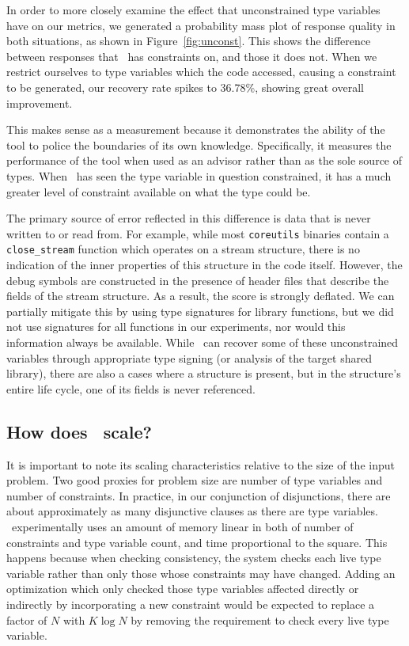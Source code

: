 In order to more closely examine the effect that unconstrained type variables have on our metrics, we generated a probability mass plot of response quality in both situations, as shown in Figure~\ref{fig:unconst}. This shows the
difference between responses that \bitr\ has constraints on, and those it does not.
When we restrict ourselves to type variables which the code accessed, causing a constraint to be generated, our recovery rate spikes to 36.78\%, showing great overall improvement.

This makes sense as a measurement because it demonstrates the ability of the tool to police the boundaries of its own knowledge. Specifically, it measures the performance of the tool when used as an advisor rather than as the sole source of types. When \bitr\ has seen the type variable in question constrained, it has a much greater level of constraint available on what the type could be.

The primary source of error reflected in this difference is data that is never written to or read from. For example, while most \texttt{coreutils} binaries contain a \texttt{close\_stream} function which operates on a stream structure, there is no indication of the inner properties of this structure in the code itself. However, the debug symbols are constructed in the presence of header files that describe the fields of the stream structure. As a result, the score is strongly deflated.
We can partially mitigate this by using type signatures for library functions, but we did not use signatures for all functions in our experiments, nor would this information always be available.
While \bitr\ can recover some of these unconstrained variables through appropriate type signing (or analysis of the target shared library), there are also a cases where a structure is present, but in the structure's entire life cycle, one of its fields is never referenced.

\subsection{How does \bitr\ scale?}
\label{subsec:speed}
It is important to note its scaling characteristics relative to the size of the input problem. Two good proxies for problem size are number of type variables and number of constraints. In practice, in our conjunction of disjunctions, there are about approximately as many disjunctive clauses as there are type variables. \bitr\ experimentally uses an amount of memory linear in both of number of constraints and type variable count, and time proportional to the square. This happens because when checking consistency, the system checks each live type variable rather than only those whose constraints may have changed. Adding an optimization which only checked those type variables affected directly or indirectly by incorporating a new constraint would be expected to replace a factor of $N$ with $K \log N$ by removing the requirement to check every live type variable.
